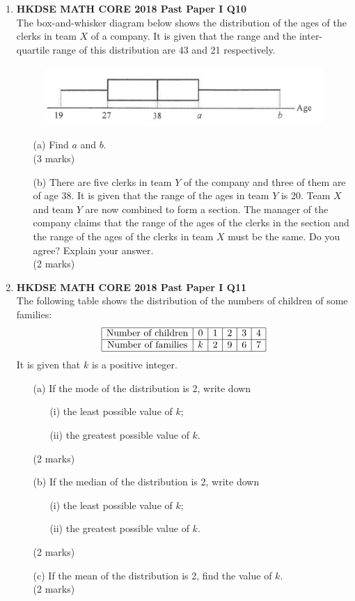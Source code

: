 \documentclass[12pt]{article}
\begin{document}
\begin{enumerate}
	\item \textbf{HKDSE MATH CORE 2018 Past Paper I Q10}\\
	The box-and-whisker diagram below shows the distribution of the ages of the clerks in team $X$ of a company. It is given that the range and the inter-quartile range of this distribution are 43 and 21 respectively.
	\begin{figure}[H]
		\centering
		\includegraphics[width = .3\linewidth]{2018Figure1.00}
	\end{figure}
	\begin{enumerate}
		\item[(a)] Find $a$ and $b$. \\(3 marks)
		\item[(b)] There are five clerks in team $Y$ of the company and three of them are of age 38. It is given that the range of the ages in team $Y$ is 20. Team $X$ and team $Y$ are now combined to form a section. The manager of the company claims that the range of the ages of the clerks in the section and the range of the ages of the clerks in team $X$ must be the same. Do you agree? Explain your answer. \\(2 marks)
	\end{enumerate}

	\item \textbf{HKDSE MATH CORE 2018 Past Paper I Q11}\\
	The following table shows the distribution of the numbers of children of some families:
	$$\begin{array}{|c|c|c|c|c|c|}
		\hline
		\text{Number of children} & 0 & 1 & 2 & 3 & 4 \\
		\hline
		\text{Number of families} & k & 2 & 9 & 6 & 7 \\
		\hline
	\end{array}$$
	It is given that $k$ is a positive integer.
	\begin{enumerate}
		\item[(a)] If the mode of the distribution is 2, write down
		\begin{enumerate}
			\item[(i)] the least possible value of $k$;
			\item[(ii)] the greatest possible value of $k$.
		\end{enumerate}
		(2 marks)
		\item[(b)] If the median of the distribution is 2, write down
		\begin{enumerate}
			\item[(i)] the least possible value of $k$;
			\item[(ii)] the greatest possible value of $k$.
		\end{enumerate}
		(2 marks)
		\item[(c)] If the mean of the distribution is 2, find the value of $k$. \\(2 marks)
	\end{enumerate}


\end{enumerate}
\end{document}
